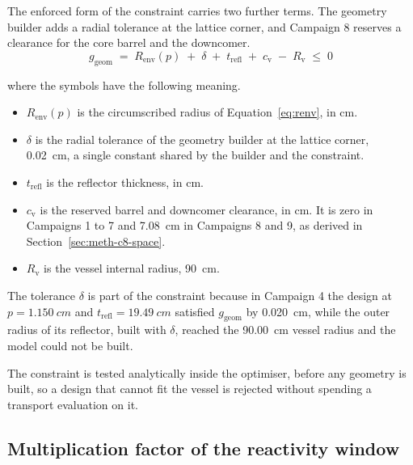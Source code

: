 The enforced form of the constraint carries two further terms. The
geometry builder adds a radial tolerance at the lattice corner, and
Campaign 8 reserves a clearance for the core barrel and the downcomer.
\begin{equation}
g_\mathrm{geom} \;=\; R_\mathrm{env}(p) \;+\; \delta \;+\;
t_\mathrm{refl} \;+\; c_\mathrm{v} \;-\; R_\mathrm{v} \;\le\; 0
\label{eq:ggeom}
\end{equation}

\noindent where the symbols have the following meaning.

\begin{itemize}
  \item $R_\mathrm{env}(p)$ is the circumscribed radius of
        Equation~\eqref{eq:renv}, in cm.

  \item $\delta$ is the radial tolerance of the geometry builder at the
        lattice corner, \SI{0.02}{cm}, a single constant shared by the
        builder and the constraint.

  \item $t_\mathrm{refl}$ is the reflector thickness, in cm.

  \item $c_\mathrm{v}$ is the reserved barrel and downcomer clearance,
        in cm. It is zero in Campaigns 1 to 7 and \SI{7.08}{cm} in
        Campaigns 8 and 9, as derived in
        Section~\ref{sec:meth-c8-space}.

  \item $R_\mathrm{v}$ is the vessel internal radius, \SI{90}{cm}.
\end{itemize}

The tolerance $\delta$ is part of the constraint because in Campaign 4 the
design at $p = \SI{1.150}{cm}$ and $t_\mathrm{refl} = \SI{19.49}{cm}$
satisfied $g_\mathrm{geom}$ by \SI{0.020}{cm}, while the outer radius of its
reflector, built with $\delta$, reached the \SI{90.00}{cm} vessel radius
and the model could not be built.

The constraint is tested analytically inside the optimiser, before any
geometry is built, so a design that cannot fit the vessel is rejected
without spending a transport evaluation on it.

\subsection{Multiplication factor of the reactivity window}
\label{sec:meth-kbasis}

